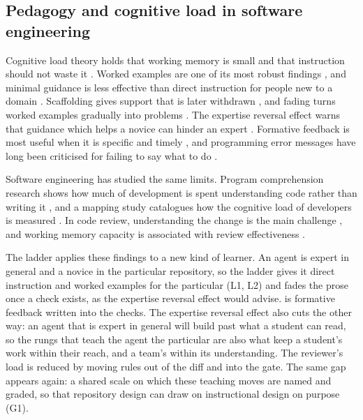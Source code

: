 \subsection{Pedagogy and cognitive load in software engineering}

Cognitive load theory holds that working memory is small and that instruction should not waste
it \citep{sweller1988cognitive}. Worked examples are one of its most robust findings
\citep{sweller1985worked}, and minimal guidance is less effective than direct instruction for
people new to a domain \citep{kirschner2006minimal}. Scaffolding gives support that is later
withdrawn \citep{wood1976scaffolding}, and fading turns worked examples gradually into problems
\citep{renkl2003fading}. The expertise reversal effect warns that guidance which helps a novice
can hinder an expert \citep{kalyuga2003reversal}. Formative feedback is most useful when it is
specific and timely \citep{shute2008feedback}, and programming error messages have long been
criticised for failing to say what to do \citep{becker2019errormessages}.

Software engineering has studied the same limits. Program comprehension research shows how much
of development is spent understanding code rather than writing it \citep{siegmund2016comprehension},
and a mapping study catalogues how the cognitive load of developers is measured
\citep{goncales2019cognitive}. In code review, understanding the change is the main challenge
\citep{bacchelli2013review}, and working memory capacity is associated with review effectiveness
\citep{baum2019workingmemory}.

The ladder applies these findings to a new kind of learner. An agent is expert in general and a
novice in the particular repository, so the ladder gives it direct instruction and worked
examples for the particular (L1, L2) and fades the prose once a check exists, as the expertise
reversal effect would advise.  is formative feedback written into
the checks. The expertise reversal effect also cuts the other way: an agent that is expert in
general will build past what a student can read, so the rungs that teach the agent the
particular are also what keep a student's work within their reach, and a team's within its
understanding. The reviewer's load is reduced by moving rules out of the diff and into the gate.
The same gap appears again: a shared scale on which these teaching moves are named and graded,
so that repository design can draw on instructional design on purpose (G1).

